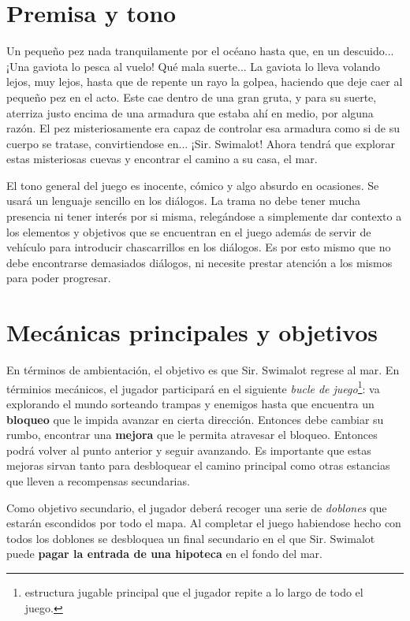 \section{Premisa y tono}

Un pequeño pez nada tranquilamente por el océano hasta que, en un descuido... ¡Una gaviota lo pesca al vuelo! Qué mala suerte... La gaviota lo lleva volando lejos, muy lejos, hasta que de repente un rayo la golpea, haciendo que deje caer al pequeño pez en el acto. Este cae dentro de una gran gruta, y para su suerte, aterriza justo encima de una armadura que estaba ahí en medio, por alguna razón. El pez misteriosamente era capaz de controlar esa armadura como si de su cuerpo se tratase, convirtiendose en... ¡Sir. Swimalot! Ahora tendrá que explorar estas misteriosas cuevas y encontrar el camino a su casa, el mar.

El tono general del juego es inocente, cómico y algo absurdo en ocasiones. Se usará un lenguaje sencillo en los diálogos. La trama no debe tener mucha presencia ni tener interés por si misma, relegándose a simplemente dar contexto a los elementos y objetivos que se encuentran en el juego además de servir de vehículo para introducir chascarrillos en los diálogos. Es por esto mismo que no debe encontrarse demasiados diálogos, ni necesite prestar atención a los mismos para poder progresar.

\section{Mecánicas principales y objetivos}

En términos de ambientación, el objetivo es que Sir. Swimalot regrese al mar. En términios mecánicos, el jugador participará en el siguiente \textit{bucle de juego}\footnote{estructura jugable principal que el jugador repite a lo largo de todo el juego.}: va explorando el mundo sorteando trampas y enemigos hasta que encuentra un \textbf{bloqueo} que le impida avanzar en cierta dirección. Entonces debe cambiar su rumbo, encontrar una \textbf{mejora} que le permita atravesar el bloqueo. Entonces podrá volver al punto anterior y seguir avanzando. Es importante que estas mejoras sirvan tanto para desbloquear el camino principal como otras estancias que lleven a recompensas secundarias.

Como objetivo secundario, el jugador deberá recoger una serie de \textit{doblones} que estarán escondidos por todo el mapa. Al completar el juego habiendose hecho con todos los doblones se desbloquea un final secundario en el que Sir. Swimalot puede \textbf{pagar la entrada de una hipoteca} en el fondo del mar.

